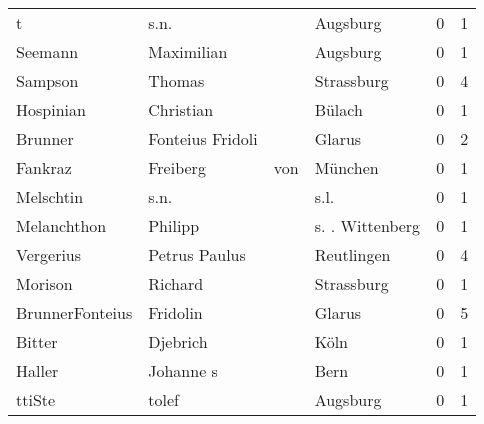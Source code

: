 \begin{center}
\begin{tiny}
\begin{longtabu}{llllrr}
                        t &                               s.n. &             &                                    Augsburg &          0 &         1 \\
                  Seemann &                         Maximilian &             &                                    Augsburg &          0 &         1 \\
                  Sampson &                             Thomas &             &                                  Strassburg &          0 &         4 \\
                Hospinian &                          Christian &             &                                      Bülach &          0 &         1 \\
                  Brunner &                   Fonteius Fridoli &             &                                      Glarus &          0 &         2 \\
                  Fankraz &                           Freiberg &         von &                                     München &          0 &         1 \\
                Melschtin &                               s.n. &             &                                        s.l. &          0 &         1 \\
              Melanchthon &                            Philipp &             &                             s. . Wittenberg &          0 &         1 \\
                Vergerius &                      Petrus Paulus &             &                                  Reutlingen &          0 &         4 \\
                  Morison &                            Richard &             &                                  Strassburg &          0 &         1 \\
          BrunnerFonteius &                           Fridolin &             &                                      Glarus &          0 &         5 \\
                   Bitter &                           Djebrich &             &                                        Köln &          0 &         1 \\
                   Haller &                          Johanne s &             &                                        Bern &          0 &         1 \\
                   ttiSte &                              tolef &             &                                    Augsburg &          0 &         1 \\

\end{longtabu}
\end{tiny}
\end{center}
